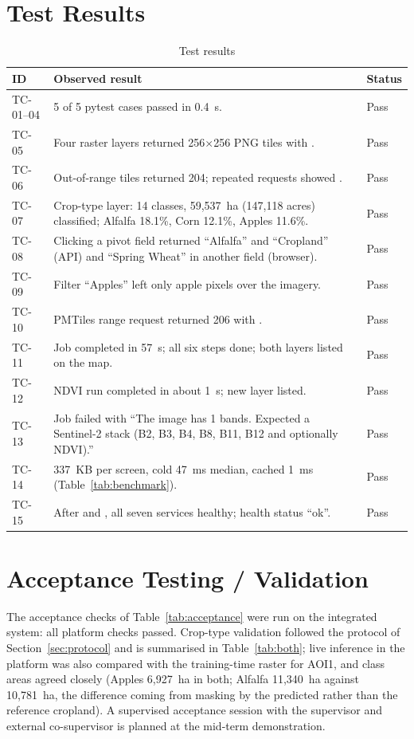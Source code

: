 \section{Test Results}
\begin{table}[htbp]
\centering\small
\caption{Test results}
\label{tab:testresults}
\begin{tabularx}{\textwidth}{L{1.1cm} Y L{1.3cm}}
\toprule
\textbf{ID} & \textbf{Observed result} & \textbf{Status}\\
\midrule
TC-01--04 & 5 of 5 pytest cases passed in 0.4~s. & Pass\\
TC-05 & Four raster layers returned 256$\times$256 PNG tiles with . & Pass\\
TC-06 & Out-of-range tiles returned 204; repeated requests showed . & Pass\\
TC-07 & Crop-type layer: 14 classes, 59,537~ha (147,118 acres) classified; Alfalfa 18.1\%, Corn 12.1\%, Apples 11.6\%. & Pass\\
TC-08 & Clicking a pivot field returned ``Alfalfa'' and ``Cropland'' (API) and ``Spring Wheat'' in another field (browser). & Pass\\
TC-09 & Filter ``Apples'' left only apple pixels over the imagery. & Pass\\
TC-10 & PMTiles range request returned 206 with . & Pass\\
TC-11 & Job completed in 57~s; all six steps done; both layers listed on the map. & Pass\\
TC-12 & NDVI run completed in about 1~s; new layer listed. & Pass\\
TC-13 & Job failed with ``The image has 1 bands. Expected a Sentinel-2 stack (B2, B3, B4, B8, B11, B12 and optionally NDVI).'' & Pass\\
TC-14 & 337~KB per screen, cold 47~ms median, cached 1~ms (Table~\ref{tab:benchmark}). & Pass\\
TC-15 & After  and , all seven services healthy; health status ``ok''. & Pass\\
\bottomrule
\end{tabularx}
\end{table}

\section{Acceptance Testing / Validation}
The acceptance checks of Table~\ref{tab:acceptance} were run on the integrated system: all platform
checks passed. Crop-type validation followed the protocol of Section~\ref{sec:protocol} and is
summarised in Table~\ref{tab:both}; live inference in the platform was also compared with the
training-time raster for AOI1, and class areas agreed closely (Apples 6,927~ha in both; Alfalfa
11,340~ha against 10,781~ha, the difference coming from masking by the predicted rather than the
reference cropland). A supervised acceptance session with the supervisor and external co-supervisor
is planned at the mid-term demonstration.


